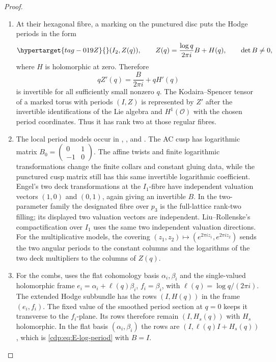 \begin{proof}

\begin{enumerate}[label=\arabic*.,leftmargin=*]
\item At their hexagonal fibre, a marking on the punctured disc puts
the Hodge periods in the form
\begin{equation}\hypertarget{tag-019Z}{}\label{cdp:eq:E-log-period}
  (I_2,Z(q)),\qquad
 Z(q)=\frac{\log q}{2\pi i}B+H(q),
 \qquad \det B\ne0,
\end{equation}
where $H$ is holomorphic at zero. Therefore
\[
 qZ'(q)=\frac{B}{2\pi i}+qH'(q)
\]
is invertible for all sufficiently small nonzero $q$. The
Kodaira--Spencer tensor of a marked torus with periods $(I,Z)$
is represented by $Z'$ after the invertible identifications of
the Lie algebra and $H^1(\mathcal O)$ with the chosen period
coordinates. Thus it has rank two at those regular fibres.

\item The local period models occur in
\cite[Proposition~6.1]{Viaclovsky2026Combs},
\cite[Proposition~3.1]{Viaclovsky2026Two}, and
\cite[Proposition~2.5]{LiuRollenske2026}.
The AC cusp has logarithmic matrix
$B_0=\left(\begin{smallmatrix}0&1\\-1&0\end{smallmatrix}\right)$.
The affine twists and finite logarithmic transformations change
the finite collars and constant gluing data, while the punctured
cusp matrix still has this same invertible logarithmic coefficient.
Engel's two deck transformations at the $I_1$-fibre have independent
valuation vectors $(1,0)$ and $(0,1)$, again giving an invertible
$B$. In the two-parameter family the designated fibre over $p_3$
is the full-lattice rank-two filling; its displayed two valuation
vectors are independent. Liu--Rollenske's compactification over
$I_1$ uses the same two independent valuation directions. For the multiplicative models, the covering
$(z_1,z_2)\mapsto(e^{2\pi iz_1},e^{2\pi iz_2})$ sends the two
angular periods to the constant columns and the logarithms of the
two deck multipliers to the columns of $Z(q)$.

\item For the combs, \cite[Proposition~4.1, case~(i)]{Viaclovsky2026Combs}
uses the flat cohomology basis $\alpha_i,\beta_i$ and the
single-valued holomorphic frame
$e_i=\alpha_i+\ell(q)\beta_i$, $f_i=\beta_i$, with
$\ell(q)=\log q/(2\pi i)$. The extended Hodge subbundle has
the rows $(I,H(q))$ in the frame $(e_i,f_i)$. The fixed value of the
smoothed period section at $q=0$ keeps it transverse to the
$f_i$-plane. Its rows therefore remain $(I,H_s(q))$ with
$H_s$ holomorphic. In the flat basis $(\alpha_i,\beta_i)$ the rows are
$(I,\ell(q)I+H_s(q))$, which is \eqref{cdp:eq:E-log-period} with
$B=I$.


\end{enumerate}
\end{proof}
